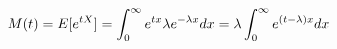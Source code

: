 \documentclass[preview]{standalone}
\begin{document}
\begin{align*}
\special{dvisvgm:raw <g id='unique000'>}M(t)=E[e^{tX}]=\displaystyle\int_0^{\infty}e^{tx}\lambda e^{-\lambda x}dx=\lambda\int_0^{\infty}e^{(t-\lambda)x}dx\special{dvisvgm:raw </g>}
\end{align*}
\end{document}
